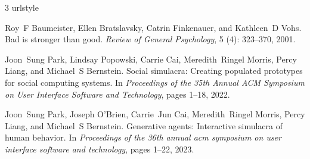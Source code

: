 \begin{thebibliography}{3}
\providecommand{\natexlab}[1]{#1}
\providecommand{\url}[1]{\texttt{#1}}
\expandafter\ifx\csname urlstyle\endcsname\relax
  \providecommand{\doi}[1]{doi: #1}\else
  \providecommand{\doi}{doi: \begingroup \urlstyle{rm}\Url}\fi

Roy~F Baumeister, Ellen Bratslavsky, Catrin Finkenauer, and Kathleen~D Vohs.
\newblock Bad is stronger than good.
\newblock \emph{Review of General Psychology}, 5 (4): 323--370, 2001.

Joon~Sung Park, Lindsay Popowski, Carrie Cai, Meredith~Ringel Morris, Percy Liang, and Michael~S Bernstein.
\newblock Social simulacra: Creating populated prototypes for social computing systems.
\newblock In \emph{Proceedings of the 35th Annual ACM Symposium on User Interface Software and Technology}, pages 1--18, 2022.

Joon~Sung Park, Joseph O'Brien, Carrie~Jun Cai, Meredith~Ringel Morris, Percy Liang, and Michael~S Bernstein.
\newblock Generative agents: Interactive simulacra of human behavior.
\newblock In \emph{Proceedings of the 36th annual acm symposium on user interface software and technology}, pages 1--22, 2023.

\end{thebibliography}
